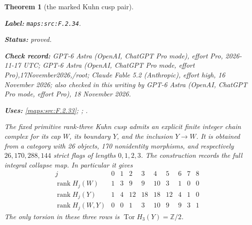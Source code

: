 \documentclass[11pt,a4paper]{article}
\newtheorem{theorem}{Theorem}[section]
\theoremstyle{definition}
\newcommand{\StatementRecord}[4]{\par\smallskip\begingroup\upshape\raggedright\noindent\textbf{Label:} \nolinkurl{#1}.\par\noindent\textbf{Status:} #2.\par\noindent\textbf{Check record:} #3.\par\noindent\textbf{Uses:} #4.\par\endgroup\smallskip}
\newcommand{\CurrentChecker}{GPT-6 Astra (OpenAI, ChatGPT Pro mode, effort Pro), 18 November 2026}
\begin{document}
\begin{theorem}[the marked Kuhn cusp pair]\label{maps:src:F.2.34}
\StatementRecord{maps:src:F.2.34}{proved}{GPT-6 Astra (OpenAI, ChatGPT Pro mode), effort Pro, 2026-11-17 UTC; GPT-6 Astra (OpenAI, ChatGPT Pro mode, effort Pro),17November2026,/root; Claude Fable 5.2 (Anthropic), effort high, 16 November 2026; also checked in this writing by \CurrentChecker}{\cref{maps:src:F.2.33}; \cite[Theorem 4.1.1 and Lemmas 4.1.2--4.1.3, pp.~480--482]{ffAchingerOgus20}; \cite[Theorem 8.7, pp.~57--59, and Corollary 8.8, p.~59, attached source build]{manYang26}}


The fixed primitive rank-three Kuhn cusp admits an explicit
finite integer chain complex for its cap $W$, its boundary
$Y$, and the inclusion $Y\to W$.  It is obtained from a
category with 26 objects, 170 nonidentity morphisms, and
respectively $26,170,288,144$ strict flags of lengths
$0,1,2,3$.  The construction records the full integral
collapse map.  In particular it gives
\[
\begin{array}{c|rrrrrrrrr}
j&0&1&2&3&4&5&6&7&8\\\hline
\operatorname{rank}H_j(W)&1&3&9&9&10&3&1&0&0\\
\operatorname{rank}H_j(Y)&1&4&12&18&18&12&4&1&0\\
\operatorname{rank}H_j(W,Y)&0&0&1&3&10&9&9&3&1
\end{array}                                                \tag{F.CK1}\label{maps:eq:F.CK1}
\]
The only torsion in these three rows is
$\operatorname{Tor}H_3(Y)=\mathbb Z/2$.

\end{theorem}
\end{document}
